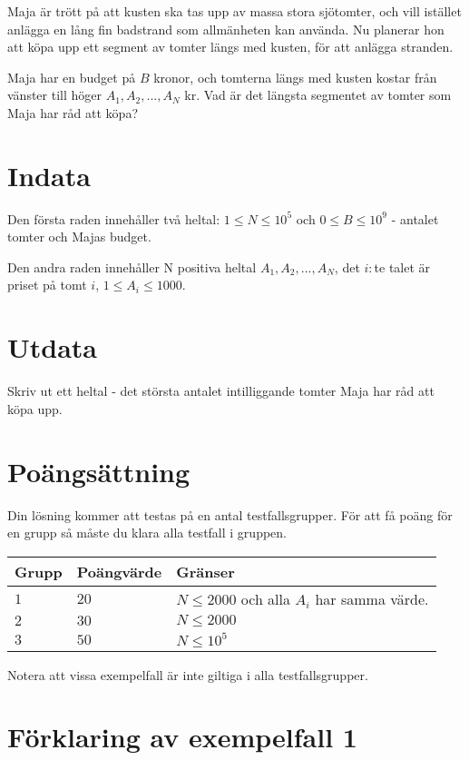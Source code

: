 Maja är trött på att kusten ska tas upp av massa stora sjötomter, och vill istället anlägga en lång fin badstrand som allmänheten kan använda.
Nu planerar hon att köpa upp ett segment av tomter längs med kusten, för att anlägga stranden.

Maja har en budget på $B$ kronor, och tomterna längs med kusten kostar från vänster till höger $A_1,A_2,...,A_N$ kr.
Vad är det längsta segmentet av tomter som Maja har råd att köpa?

\section*{Indata}
Den första raden innehåller två heltal: $1\leq N \leq 10^5$ och $0 \leq B \leq 10^9$ - antalet tomter och Majas budget.

Den andra raden innehåller N positiva heltal $A_1,A_2,...,A_N$, det $i:$te talet är priset på tomt $i$, $1\le A_i \le 1000$.


\section*{Utdata}
Skriv ut ett heltal - det största antalet intilliggande tomter Maja har råd att köpa upp.

\section*{Poängsättning}
Din lösning kommer att testas på en antal testfallsgrupper.
För att få poäng för en grupp så måste du klara alla testfall i gruppen.

\noindent
\begin{tabular}{| l | l | p{12cm} |}
  \hline
  Grupp & Poängvärde & Gränser \\ \hline
  $1$   & $20$       & $N \leq 2000 $ och alla $A_i$ har samma värde.\\ \hline
  $2$   & $30$       & $N \leq 2000 $\\ \hline
  $3$   & $50$       & $N \leq 10^5 $  \\ \hline
\end{tabular}

Notera att vissa exempelfall är inte giltiga i alla testfallsgrupper.

\section*{Förklaring av exempelfall 1}
